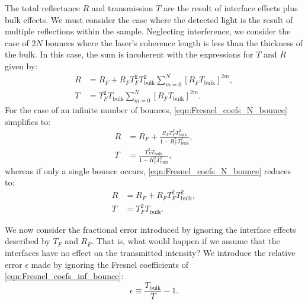 The total reflectance $R$ and transmission $T$ are the result of interface effects plus bulk effects. We must consider the case where the detected light is the result of multiple reflections within the sample. Neglecting interference, we consider the case of $2N$ bounces where the laser's coherence length is less than the thickness of the bulk. In this case, the sum is incoherent with the expressions for $T$ and $R$ given by:
\begin{equation}
	\begin{aligned}
		R &= R_F + R_F T_F^2 T_{\text{bulk}}^2 \sum_{m=0}^{N} \left[ R_F T_{\text{bulk}} \right]^{2m}, \\
		T &= T_F^2 T_{\text{bulk}} \sum_{m=0}^{N} \left[ R_F T_{\text{bulk}} \right]^{2m}.
	\end{aligned}
	\label{eqn:Fresnel_coefs_N_bounce}
\end{equation}
For the case of an infinite number of bounces, \cref{eqn:Fresnel_coefs_N_bounce} simplifies to:
\begin{equation}
	\begin{aligned}
		R &= R_F + \frac{R_F T_F^2 T_{\text{bulk}}^2}{1-R_F^2 T_{\text{bulk}}^2}, \\
		T &= \frac{T_F^2 T_{\text{bulk}}}{1-R_F^2 T_{\text{bulk}}^2},
	\end{aligned}
	\label{eqn:Fresnel_coefs_inf_bounce}
\end{equation}
whereas if only a single bounce occurs, \cref{eqn:Fresnel_coefs_N_bounce} reduces to:
\begin{equation}
	\begin{aligned}
		R &= R_F + R_F T_F^2 T_{\text{bulk}}^2, \\
		T &= T_F^2 T_{\text{bulk}}.
	\end{aligned}
	\label{eqn:Fresnel_coefs_1_bounce}
\end{equation}

We now consider the fractional error introduced by ignoring the interface effects described by $T_F$ and $R_F$. That is, what would happen if we assume that the interfaces have no effect on the transmitted intensity? We introduce the relative error $\epsilon$ made by ignoring the Fresnel coefficients of \cref{eqn:Fresnel_coefs_inf_bounce}:
\begin{equation}
	\epsilon \equiv \frac{T_{\text{bulk}}}{T} - 1.
	\label{eqn:Fresnel_rel_err}
\end{equation}

